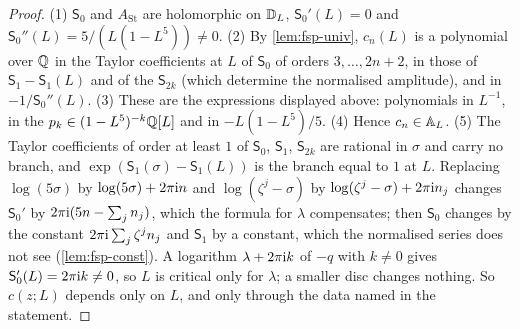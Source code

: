 \begin{proof}
(1) $\mathsf S_0$ and $A_{\mathrm{St}}$ are holomorphic on $\mathbb{D}_L$, $\mathsf S_0'(L)=0$ and $\mathsf S_0''(L)=5/(L(1-L^5))\neq0$. (2) By \cref{lem:fsp-univ}, $c_n(L)$ is a polynomial over $\mathbb{Q}$ in the Taylor coefficients at $L$ of $\mathsf S_0$ of orders $3,\dots,2n+2$, in those of $\mathsf S_1-\mathsf S_1(L)$ and of the $\mathsf S_{2k}$ (which determine the normalised amplitude), and in $-1/\mathsf S_0''(L)$. (3) These are the expressions displayed above: polynomials in $L^{-1}$, in the $p_k\in(1-L^5)^{-k}\mathbb{Q}[L]$ and in $-L(1-L^5)/5$. (4) Hence $c_n\in\mathbb{A}_{L}$. (5) The Taylor coefficients of order at least $1$ of $\mathsf S_0$, $\mathsf S_1$, $\mathsf S_{2k}$ are rational in $\sigma$ and carry no branch, and $\exp(\mathsf S_1(\sigma)-\mathsf S_1(L))$ is the branch equal to $1$ at $L$. Replacing $\log(5\sigma)$ by $\log(5\sigma)+2\pi\mathrm{i} n$ and $\log(\zeta^j-\sigma)$ by $\log(\zeta^j-\sigma)+2\pi\mathrm{i} n_j$ changes $\mathsf S_0'$ by $2\pi\mathrm{i}(5n-\sum_jn_j)$, which the formula for $\lambda$ compensates; then $\mathsf S_0$ changes by the constant $2\pi\mathrm{i}\sum_j\zeta^jn_j$ and $\mathsf S_1$ by a constant, which the normalised series does not see (\cref{lem:fsp-const}). A logarithm $\lambda+2\pi\mathrm{i} k$ of $-q$ with $k\neq0$ gives $\mathsf S_0'(L)=2\pi\mathrm{i} k\neq0$, so $L$ is critical only for $\lambda$; a smaller disc changes nothing. So $c(z;L)$ depends only on $L$, and only through the data named in the statement.
\end{proof}

